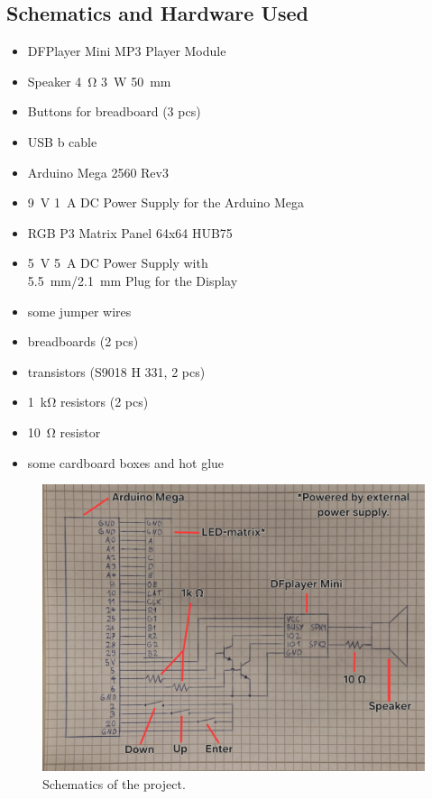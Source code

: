 \documentclass[10pt, a4paper]{article}
\begin{document}
\subsection*{Schematics and Hardware Used}
\begin{multicols}{2}
\begin{itemize}
    \item DFPlayer Mini MP3 Player Module
    \item Speaker \SI{4}{\ohm} \SI{3}{\watt} \SI{50}{\milli\meter}
    \item Buttons for breadboard (3 pcs)
    \item USB b cable
    \item Arduino Mega 2560 Rev3
    \item \SI{9}{\volt} \SI{1}{\ampere} DC Power Supply for the Arduino Mega
    \item RGB P3 Matrix Panel 64x64 HUB75
    \item \SI{5}{\volt} \SI{5}{\ampere} DC Power Supply with \\ \SI{5.5}{\milli\meter}/\SI{2.1}{\milli\meter} Plug for the Display
    \item some jumper wires
    \item breadboards (2 pcs)
    \item transistors (S9018 H 331, 2 pcs)
    \item \SI{1}{\kilo\ohm} resistors (2 pcs)
    \item \SI{10}{\ohm} resistor
    \item some cardboard boxes and hot glue
\end{itemize}
\end{multicols}

\begin{figure}[h]
    \centering
    \includegraphics[width=0.9\linewidth]{schematics.jpg}
    \caption{Schematics of the project.}
\end{figure}
\end{document}
